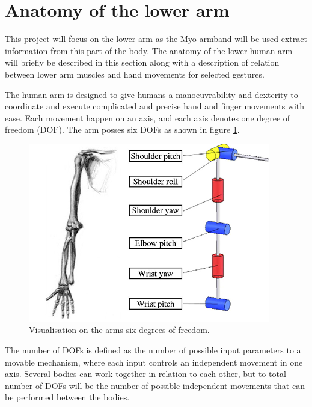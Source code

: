 \section{Anatomy of the lower arm}


This project will focus on the lower arm as the Myo armband will be used extract information from this part of the body. The anatomy of the lower human arm will briefly be described in this section along with a description of relation between lower arm muscles and hand movements for selected gestures. 

The human arm is designed to give humans a manoeuvrability and dexterity to coordinate and execute complicated and precise hand and finger movements with ease. Each movement happen on an axis, and each axis denotes one degree of freedom (DOF). The arm posses six DOFs as shown in figure \ref{fig:armDOF}.

\begin{figure}[H]                                         %
	\includegraphics[width=.4\textwidth]{figures/anatomy/human_arm_dof}  %
	\caption{Visualisation on the arms six degrees of freedom. \cite{http://reset.etsii.upm.es/en/projects/robotic-arm/}}
	\label{fig:armDOF}  %
\end{figure}

The number of DOFs is defined as the number of possible input parameters to a movable mechanism, where each input controls an independent movement in one axis. Several bodies can work together in relation to each other, but to total number of DOFs will be the number of possible independent movements that can be performed between the bodies. \cite{dicker2003}


